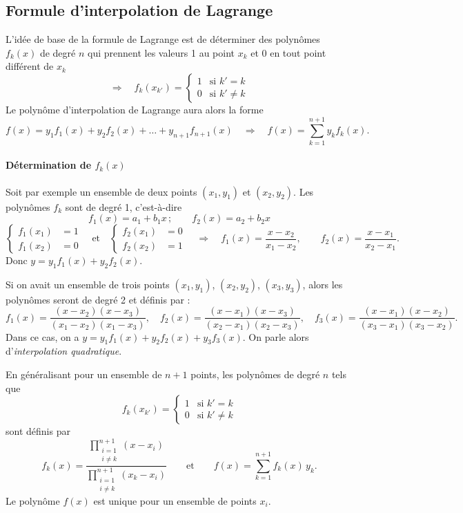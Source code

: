 \subsection{Formule d'interpolation de Lagrange}

L'idée de base de la formule de Lagrange est de déterminer des polynômes
$f_k(x)$ de degré $n$ qui prennent les valeurs 1 au point $x_k$ et 0 en tout
point différent de $x_k$
\[
  \Longrightarrow\quad
  f_k(x_{k'}) =
  \begin{cases}
    1 & \text{si } k' = k\\
    0 & \text{si } k' \neq k
  \end{cases}
\]
Le polynôme d'interpolation de Lagrange aura alors la forme
\[
  f(x) = y_1f_1(x) + y_2f_2(x) + \dots + y_{n+1}f_{n+1}(x)
  \quad\Longrightarrow\quad
  f(x) = \sum_{k=1}^{n+1} y_kf_k(x).
\]

\paragraph{Détermination de $f_k(x)$}

Soit par exemple un ensemble de deux points $(x_1, y_1)$ et $(x_2, y_2)$. Les
polynômes $f_k$ sont de degré 1, c'est-à-dire
\[
  f_1(x) = a_1 + b_1x\,; \qquad f_2(x) = a_2 + b_2x
\]
\[
  \left\{
  \begin{aligned}
    f_1(x_1) &= 1\\
    f_1(x_2) &= 0
  \end{aligned}
  \right.
  \quad\text{et}\quad
  \left\{
  \begin{aligned}
    f_2(x_1) &= 0\\
    f_2(x_2) &= 1
  \end{aligned}
  \right.
  \quad\Longrightarrow\quad
  f_1(x) = \frac{x - x_2}{x_1 - x_2}, \qquad
  f_2(x) = \frac{x - x_1}{x_2 - x_1}.
\]
Donc $y = y_1f_1(x) + y_2f_2(x)$.

Si on avait un ensemble de trois points $(x_1, y_1)$, $(x_2, y_2)$,
$(x_3, y_3)$, alors les polynômes seront de degré 2 et définis par :
\[
  f_1(x) = \frac{(x - x_2)(x - x_3)}{(x_1 - x_2)(x_1 - x_3)}, \quad
  f_2(x) = \frac{(x - x_1)(x - x_3)}{(x_2 - x_1)(x_2 - x_3)}, \quad
  f_3(x) = \frac{(x - x_1)(x - x_2)}{(x_3 - x_1)(x_3 - x_2)} .
\]
Dans ce cas, on a $y = y_1f_1(x) + y_2f_2(x) + y_3f_3(x)$. On parle alors
d'\emph{interpolation quadratique}.

En généralisant pour un ensemble de $n+1$ points, les polynômes de degré $n$
tels que
\[
  f_k(x_{k'}) =
  \begin{cases}
    1 & \text{si } k' = k\\
    0 & \text{si } k' \neq k
  \end{cases}
\]
sont définis par
\[
  f_k(x) = \frac{\displaystyle\prod_{\substack{i=1\\ i\neq k}}^{n+1}(x - x_i)}
                {\displaystyle\prod_{\substack{i=1\\ i\neq k}}^{n+1}(x_k - x_i)}
  \qquad\text{et}\qquad
  f(x) = \sum_{k=1}^{n+1} f_k(x)\,y_k .
\]
Le polynôme $f(x)$ est unique pour un ensemble de points $x_i$.

